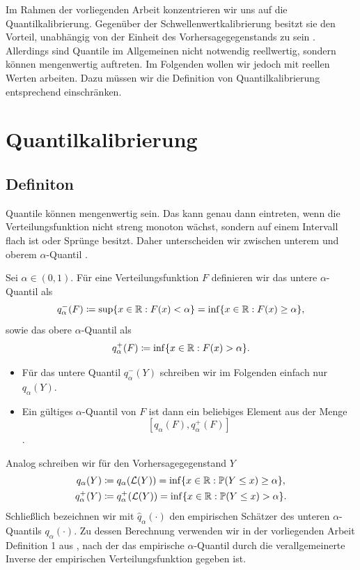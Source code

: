 Im Rahmen der vorliegenden Arbeit konzentrieren wir uns auf die Quantilkalibrierung. Gegenüber der Schwellenwertkalibrierung besitzt sie den Vorteil, unabhängig von der Einheit des Vorhersagegegenstands zu sein \parencite{bentzienDecomposition2014}. Allerdings sind Quantile im Allgemeinen nicht notwendig reellwertig, sondern können mengenwertig auftreten.  Im Folgenden wollen wir jedoch mit reellen Werten arbeiten. Dazu müssen wir die Definition von Quantilkalibrierung entsprechend einschränken.


\section{Quantilkalibrierung} \label{seq:Quantcal}
\subsection{Definiton}
Quantile können mengenwertig sein. Das kann genau dann eintreten, wenn die Verteilungsfunktion nicht streng monoton wächst, sondern auf einem Intervall flach ist oder Sprünge besitzt. Daher unterscheiden wir zwischen unterem und oberem $\alpha$-Quantil \parencite{gneiting2023model}.

\begin{defi}
Sei $\alpha \in (0,1)$. Für eine Verteilungsfunktion $F$ definieren wir das untere $\alpha$-Quantil als
\begin{equation}\label{eq:lowerquantile}
    q^-_\alpha(F)
    \coloneqq
    \sup \{ x \in \mathbb{R} : F(x) < \alpha \}
    =
    \inf \{ x \in \mathbb{R} : F(x) \ge \alpha \},
    \end{equation}
    sowie das obere $\alpha$-Quantil als
    \begin{equation}\label{eq:upperquantile}
    q^+_\alpha(F)
    \coloneqq
    \inf \{ x \in \mathbb{R} : F(x) > \alpha \}.
\end{equation}
\noindent
\begin{itemize}
    \item Für das untere Quantil $q^-_\alpha(Y)$ schreiben wir im Folgenden einfach nur  $q_\alpha(Y)$.
    \item Ein gültiges $\alpha$-Quantil von $F$ ist dann ein beliebiges Element aus der Menge 
    \[
    \left[q_\alpha(F),q^+_\alpha(F)\right]
    \].
\end{itemize}
\end{defi}
\noindent
Analog schreiben wir für den Vorhersagegegenstand $Y$ \begin{align*}
    q_\alpha(Y) &\coloneqq  q_\alpha(\mathcal{L}(Y)) = \inf \{ x \in \mathbb{R} : \mathbb{P}(Y \le x) \ge \alpha \},\\
    q^+_\alpha(Y)&\coloneqq q^+_\alpha(\mathcal{L}(Y)) = \inf \{ x \in \mathbb{R} : \mathbb{P}(Y \le x) > \alpha \}.
\end{align*}
Schließlich bezeichnen wir mit $\hat q_\alpha(\cdot)$ den empirischen Schätzer des unteren $\alpha$-Quantils $q_\alpha(\cdot)$. Zu dessen Berechnung verwenden wir in der vorliegenden Arbeit Definition 1 aus \textcite{hyndman1996sample}, nach der das empirische $\alpha$-Quantil durch die verallgemeinerte Inverse der empirischen Verteilungsfunktion gegeben ist.
 
